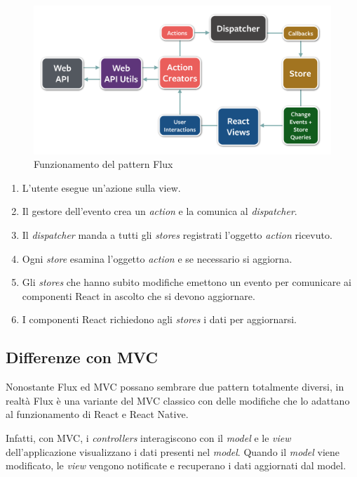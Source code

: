 \begin{figure}[htp]
\centering
\includegraphics[width=\textwidth*3/4]{../immagini/flux-diagram}
\caption{Funzionamento del pattern Flux}  
\end{figure}
\FloatBarrier

\begin{enumerate}
\item L'utente esegue un'azione sulla view.
\item Il gestore dell'evento crea un \textit{action} e la comunica al \textit{dispatcher}.
\item Il \textit{dispatcher} manda a tutti gli \textit{stores} registrati l'oggetto \textit{action} ricevuto.
\item Ogni \textit{store} esamina l'oggetto  \textit{action} e se necessario si aggiorna. 
\item Gli \textit{stores} che hanno subito modifiche emettono un evento per comunicare ai componenti React in ascolto che si devono aggiornare.
\item I componenti React richiedono agli \textit{stores} i dati per aggiornarsi.
\end{enumerate}

\subsection{Differenze con MVC}

Nonostante Flux ed MVC possano sembrare due pattern totalmente diversi, in realtà Flux è una variante del MVC classico con delle modifiche che lo adattano al funzionamento di React e React Native.

Infatti, con MVC, i \textit{controllers} interagiscono con il \textit{model} e le \textit{view} dell'applicazione visualizzano i dati presenti nel \textit{model}.
Quando il \textit{model} viene modificato, le \textit{view} vengono notificate e recuperano i dati aggiornati dal model.

